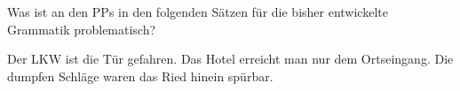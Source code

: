 Was ist an den PPs in den folgenden Sätzen für die bisher entwickelte Grammatik problematisch?

\Halbzeile


\begin{exe}
  \ex Der LKW ist  die Tür gefahren.
  \ex Das Hotel erreicht man nur  dem Ortseingang.
  \ex Die dumpfen Schläge waren  das Ried hinein spürbar.
\end{exe}

\Sol{\newpage\hspace{1em}}

